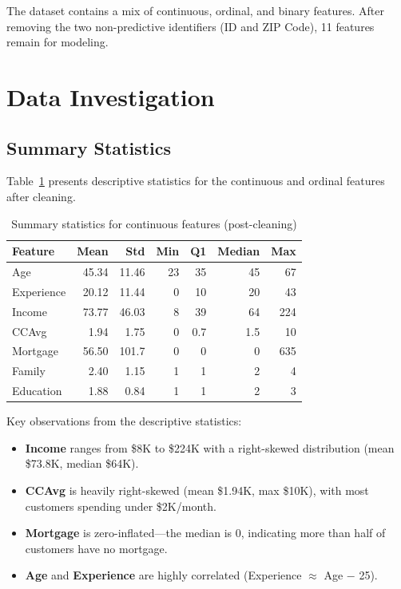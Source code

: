 \documentclass[11pt, a4paper]{article}
\begin{document}
The dataset contains a mix of continuous, ordinal, and binary features. After
removing the two non-predictive identifiers (ID and ZIP Code), 11 features
remain for modeling.

\section{Data Investigation}

\subsection{Summary Statistics}

Table~\ref{tab:stats} presents descriptive statistics for the continuous and
ordinal features after cleaning.

\begin{table}[H]
\centering
\caption{Summary statistics for continuous features (post-cleaning)}
\label{tab:stats}
\begin{tabular}{@{} l r r r r r r @{}}
\toprule
\textbf{Feature} & \textbf{Mean} & \textbf{Std} & \textbf{Min} & \textbf{Q1} & \textbf{Median} & \textbf{Max} \\
\midrule
Age         & 45.34 & 11.46 &  23 &  35 &  45 &  67 \\
Experience  & 20.12 & 11.44 &   0 &  10 &  20 &  43 \\
Income      & 73.77 & 46.03 &   8 &  39 &  64 & 224 \\
CCAvg       &  1.94 &  1.75 &   0 & 0.7 & 1.5 &  10 \\
Mortgage    & 56.50 & 101.7 &   0 &   0 &   0 & 635 \\
Family      &  2.40 &  1.15 &   1 &   1 &   2 &   4 \\
Education   &  1.88 &  0.84 &   1 &   1 &   2 &   3 \\
\bottomrule
\end{tabular}
\end{table}

Key observations from the descriptive statistics:
\begin{itemize}[itemsep=2pt]
    \item \textbf{Income} ranges from \$8K to \$224K with a right-skewed
          distribution (mean \$73.8K, median \$64K).
    \item \textbf{CCAvg} is heavily right-skewed (mean \$1.94K, max \$10K),
          with most customers spending under \$2K/month.
    \item \textbf{Mortgage} is zero-inflated---the median is 0, indicating more
          than half of customers have no mortgage.
    \item \textbf{Age} and \textbf{Experience} are highly correlated
          (Experience $\approx$ Age $-$ 25).
\end{itemize}
\end{document}
